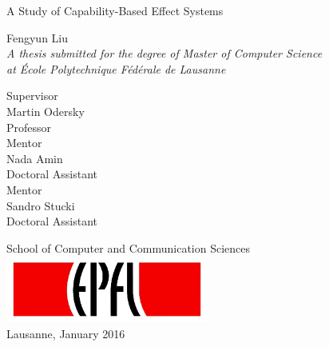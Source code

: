 \begin{titlepage}

  \begin{center}

    \vspace*{2\baselineskip}
    {\LARGE A Study of Capability-Based Effect Systems\\[2cm] }

    \noindent
    Fengyun Liu \\[2cm]

    \noindent
    \emph{A thesis submitted for the degree of Master of Computer
      Science \\
    at École Polytechnique Fédérale de Lausanne} \\[1.8cm]

    \noindent
    \begin{multicols}{3}
    Supervisor \\
    Martin Odersky \\
    Professor \\
    \vfill
    \columnbreak
    Mentor \\
    Nada Amin \\
    Doctoral Assistant \\
    \vfill
    \columnbreak
    Mentor \\
    Sandro Stucki\\
    Doctoral Assistant \\
    \end{multicols}

    \vspace*{2\baselineskip}

    \noindent
    {School of Computer and Communication Sciences \\[1cm]}
    \includegraphics[width=0.5\textwidth]{img/epfl}~\\[1cm]
    \noindent
    Lausanne, January 2016 \\[1cm]



  \end{center}

\end{titlepage}
